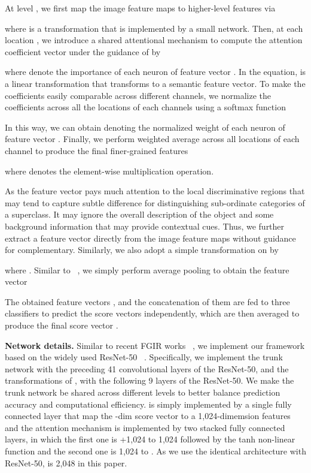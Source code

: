 \documentclass[sigconf]{acmart}
\begin{document}
At level , we first map the image feature maps  to higher-level features  via


where  is a transformation that is implemented by a small network. Then, at each location , we introduce a shared attentional mechanism  to compute the attention coefficient vector under the guidance of  by

where  denote the importance of each neuron of feature vector . In the equation,  is a linear transformation that transforms  to a semantic feature vector. To make the coefficients easily comparable across different channels, we normalize the coefficients across all the locations of each channels  using a softmax function

In this way, we can obtain  denoting the normalized weight of each neuron of feature vector . Finally, we perform weighted average across all locations of each channel to produce the final finer-grained features

where  denotes the element-wise multiplication operation. 

As the feature vector  pays much attention to the local discriminative regions that may tend to capture subtle difference for distinguishing sub-ordinate categories of a superclass. It may ignore the overall description of the object and some background information that may provide contextual cues. Thus, we further extract a feature vector directly from the image feature maps  without guidance for complementary. Similarly, we also adopt a simple transformation  on  by

where . Similar to ~\cite{he2016deep}, we simply perform average pooling to obtain the feature vector 


The obtained feature vectors ,  and the concatenation of them  are fed to three classifiers to predict the score vectors independently, which are then averaged to produce the final score vector .

\noindent\textbf{Network details. }Similar to recent FGIR works ~\cite{liu2016fully,liu2017localizing}, we implement our framework based on the widely used ResNet-50 ~\cite{he2016deep}. Specifically, we implement the trunk network with the preceding 41 convolutional layers of the ResNet-50, and the transformations of ,  with the following 9 layers of the ResNet-50. We make the trunk network be shared across different levels to better balance prediction accuracy and computational efficiency.  is simply implemented by a single fully connected layer that map the -dim score vector to a 1,024-dimemsion features and the attention mechanism  is implemented by two stacked fully connected layers, in which the first one is +1,024 to 1,024 followed by the tanh non-linear function and the second one is 1,024 to . As we use the identical architecture with ResNet-50,  is 2,048 in this paper.
\end{document}

